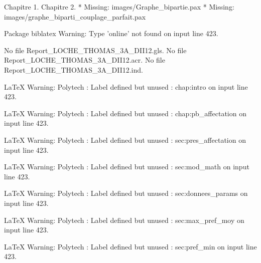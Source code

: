 Chapitre 1.
Chapitre 2.
* Missing: images/Graphe_bipartie.pax
* Missing: images/graphe_biparti_couplage_parfait.pax

Package biblatex Warning: Type 'online' not found on input line 423.

No file Report_LOCHE_THOMAS_3A_DII12.gls.
No file Report_LOCHE_THOMAS_3A_DII12.acr.
No file Report_LOCHE_THOMAS_3A_DII12.ind.

LaTeX Warning: Polytech : Label defined but unused : chap:intro on input line 423.


LaTeX Warning: Polytech : Label defined but unused : chap:pb_affectation on input line 423.


LaTeX Warning: Polytech : Label defined but unused : sec:pres_affectation on input line 423.


LaTeX Warning: Polytech : Label defined but unused : sec:mod_math on input line 423.


LaTeX Warning: Polytech : Label defined but unused : sec:donnees_params on input line 423.


LaTeX Warning: Polytech : Label defined but unused : sec:max_pref_moy on input line 423.


LaTeX Warning: Polytech : Label defined but unused : sec:pref_min on input line 423.





